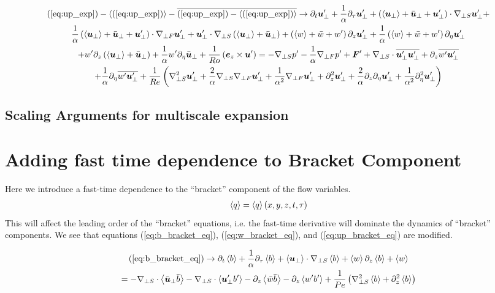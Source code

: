 \documentclass{article}
\begin{document}
\begin{multline}
    (\ref{eq:up_exp}) - \left<(\ref{eq:up_exp})\right> - \overline{(\ref{eq:up_exp}) -
    \left<(\ref{eq:up_exp})\right>} \to \partial_t \boldsymbol{u}'_{\perp} +
    \frac{1}{\alpha}\partial_{\tau} \boldsymbol{u}'_{\perp} + \left(\left<\boldsymbol{u}_{\perp}\right> +
    \bar{\boldsymbol{u}}_{\perp} + \boldsymbol{u}_{\perp}'\right)\cdot\nabla_{\perp S} \boldsymbol{u}'_{\perp} +
    \\
    \frac{1}{\alpha}\left(\left<\boldsymbol{u}_{\perp}\right> +
    \bar{\boldsymbol{u}}_{\perp} + \boldsymbol{u}_{\perp}'\right)\cdot\nabla_{\perp F} \boldsymbol{u}'_{\perp}
    + \boldsymbol{u}_{\perp}'\cdot\nabla_{\perp S}\left(\left<\boldsymbol{u}_{\perp}\right> + \bar{\boldsymbol{u}}_{\perp}\right)
    + \left(\left<w\right> + \bar{w} + w'\right)\partial_z\boldsymbol{u}'_{\perp} + \frac{1}{\alpha}\left(\left<w\right> + \bar{w} + w'\right)\partial_{\eta}\boldsymbol{u}'_{\perp}  
    \\
    +  w'\partial_z\left(\left<\boldsymbol{u}_{\perp}\right> +
    \bar{\boldsymbol{u}}_{\perp}\right) + \frac{1}{\alpha}w'\partial_{\eta}\bar{\boldsymbol{u}}_{\perp} +
    \frac{1}{Ro}\left(\boldsymbol{e}_z \times \boldsymbol{u}'\right)
     = -\nabla_{\perp S} p' - \frac{1}{\alpha}\nabla_{\perp F} p' + \boldsymbol{F}' + 
     \nabla_{\perp S}\cdot\overline{\boldsymbol{u}_{\perp}'\boldsymbol{u}'_{\perp}} +
    \partial_z\overline{w'\boldsymbol{u}'_{\perp}} 
    \\
    +\frac{1}{\alpha}\partial_{\eta}\overline{w'\boldsymbol{u}'_{\perp}}
    + \frac{1}{Re}\left(\nabla_{\perp S}^2\boldsymbol{u}'_{\perp} + \frac{2}{\alpha}\nabla_{\perp S}\nabla_{\perp F}
    \boldsymbol{u}'_{\perp} +
    \frac{1}{\alpha^2}\nabla_{\perp F} \boldsymbol{u}'_{\perp} + \partial_z^2\boldsymbol{u}'_{\perp} +
    \frac{2}{\alpha}\partial_z\partial_{\eta}\boldsymbol{u}'_{\perp} +
    \frac{1}{\alpha^2}\partial_{\eta}^2\boldsymbol{u}'_{\perp}\right) \label{eq:up_pert_eq}
\end{multline}

\subsection{Scaling Arguments for multiscale expansion}


\section{Adding fast time dependence to Bracket Component}

Here we introduce a fast-time dependence to the ``bracket'' component of the
flow variables. 
\begin{gather*}
    \left<q\right> = \left<q\right>(x, y, z, t, \tau)
\end{gather*}
This will affect the leading order of the ``bracket'' equations, i.e. the
fast-time derivative will dominate the dynamics of ``bracket'' components. We
see that equations (\ref{eq:b_bracket_eq}), (\ref{eq:w_bracket_eq}), and
(\ref{eq:up_bracket_eq}) are modified.

\begin{multline}
    (\ref{eq:b_bracket_eq}) \to \partial_t \left<b\right> +
    \frac{1}{\alpha}\partial_{\tau}\left<b\right> + 
    \left<\boldsymbol{u}_{\perp}\right>\cdot\nabla_{\perp S}\left<b\right> 
     + \left<w\right>\partial_z\left<b\right> 
     + \left<w\right>
     \\
    = -\nabla_{\perp S}\cdot\left<\bar{\boldsymbol{u}}_{\perp} \bar{b}\right> -
    \nabla_{\perp S}\cdot\left<\boldsymbol{u}'_{\perp} b'\right>-\partial_z\left<\bar{w}\bar{b}\right> - \partial_z\left<w'b'\right>
    + \frac{1}{Pe}\left(\nabla_{\perp S}^2\left<b\right> + \partial_z^2\left<b\right>\right) 
    \label{eq:new_b_bracket_eq}
\end{multline}
\end{document}
